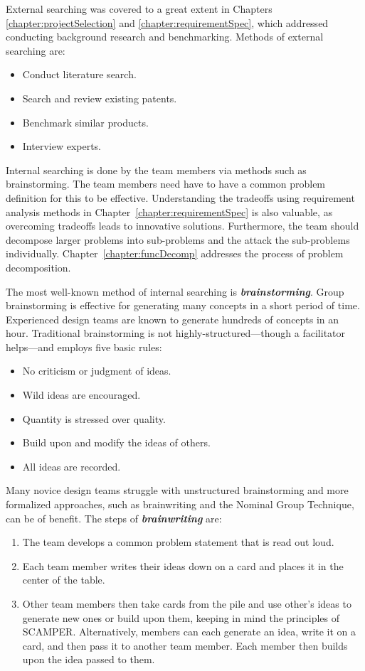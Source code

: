 External searching was covered to a great extent in 
Chapters \ref{chapter:projectSelection} and 
\ref{chapter:requirementSpec},
which addressed conducting background research and benchmarking. Methods
of external searching are:

\begin{itemize}
\item
  Conduct literature search.
\item
  Search and review existing patents.
\item
  Benchmark similar products.
\item
  Interview experts.
\end{itemize}

Internal searching is done by the team members via methods such as
brainstorming. The team members need have to have a common problem
definition for this to be effective. Understanding the tradeoffs using
requirement analysis methods in Chapter~\ref{chapter:requirementSpec} 
is also valuable, as
overcoming tradeoffs leads to innovative solutions. Furthermore, the
team should decompose larger problems into sub-problems and the attack
the sub-problems individually. 
Chapter~\ref{chapter:funcDecomp} addresses the process of
problem decomposition.

The most well-known method of internal searching is
\emph{\textbf{brainstorming}}. Group brainstorming is effective for
generating many concepts in a short period of time. Experienced design
teams are known to generate hundreds of concepts in an hour. Traditional
brainstorming is not highly-structured---though a facilitator
helps---and employs five basic rules:

\begin{itemize}
\item
  No criticism or judgment of ideas.
\item
  Wild ideas are encouraged.
\item
  Quantity is stressed over quality.
\item
  Build upon and modify the ideas of others.
\item
  All ideas are recorded.
\end{itemize}

Many novice design teams struggle with unstructured brainstorming and
more formalized approaches, such as brainwriting and the Nominal Group
Technique, can be of benefit. The steps of \emph{\textbf{brainwriting}}
are:

\begin{enumerate}
\def\labelenumi{\arabic{enumi}.}
\item
  The team develops a common problem statement that is read out loud.
\item
  Each team member writes their ideas down on a card and places it in
  the center of the table.
\item
  Other team members then take cards from the pile and use other's ideas
  to generate new ones or build upon them, keeping in mind the
  principles of SCAMPER. Alternatively, members can each generate an
  idea, write it on a card, and then pass it to another team member.
  Each member then builds upon the idea passed to them.
\end{enumerate}

